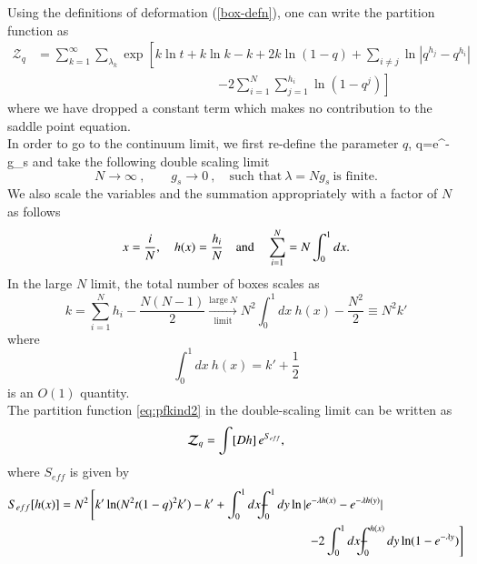 \documentclass[3p,12pt]{elsarticle}
\numberwithin{equation}{section}
\begin{document}
Using the definitions of \qq deformation (\ref{box-defn}), one can write the partition function as
%
\begin{equation}\label{eq:pfkind2}
	\begin{aligned}
	\mathcal{Z}_q & = \sum_{k=1}^{\infty}\sum_{\lambda_k}\exp \left[k \ln t + k \ln k-k+2k \ln (1-q)  + \sum_{i \neq j}\ln |q^{h_j}-q^{h_i}|\right. \\
	& \hspace{6cm} \left. - 2\sum_{i=1}^N \sum_{j=1}^{h_i}\ln (1-q^j)\right]
	\end{aligned}
\end{equation}
%
where we have dropped a constant term which makes no contribution to the saddle point equation.\\
In order to go to the continuum limit, we first re-define the parameter $q$,
%
\ben
q=e^{-g_s}
\een
%
and take the following double scaling limit
\begin{equation}\label{eq:doublescalling}
N \to \infty\ , \qquad g_s \to 0\ , \quad \mbox{such that}\ \lambda =N g_s\ \text{is finite.} 
\end{equation}
We also scale the variables and the summation appropriately with a factor of $N$ as follows
\begin{equation}
x=\frac{i}{N} , \quad  h(x) = \frac{h_i}{N}\quad \text{and} \quad \sum_{i=1}^{N} = N\int_0^1 dx.
\end{equation}
In the large $N$ limit, the total number of boxes scales as
\begin{equation}
k=\sum_{i=1}^N h_i -\frac{N(N-1)}{2} \xrightarrow[\text{limit}]{\text{large}\ N}N^2\int_0^1 dx\ h(x) -\frac{N^2}{2} \equiv N^2k'
\end{equation}
where
\begin{equation}
\int_0^1 dx\ h(x)=k'+\frac{1}{2}
\end{equation}
is an $O(1)$ quantity.\\
The partition function \eqref{eq:pfkind2} in the double-scaling limit can be written as
%
\begin{equation}
\mathcal{Z}_q =\int [Dh]\, e^{S_{eff}},   
\end{equation}
where $S_{eff}$ is given by
\begin{equation}
	\begin{aligned}
	S_{eff}[h(x)]&=N^2 \left[k' \ln (N^2 t (1-q)^2 k')-k'+\int_0^1 dx \Xint-_0^1 dy \ln |e^{-\lambda h(x)}-e^{-\lambda h(y)}|\right.\\
	&\hspace*{7cm}\left. -2\int_0^1 dx \Xint-_0^{h(x)}dy \ln (1-e^{-\lambda y}) \right]
	\end{aligned}
\end{equation}
\end{document}
